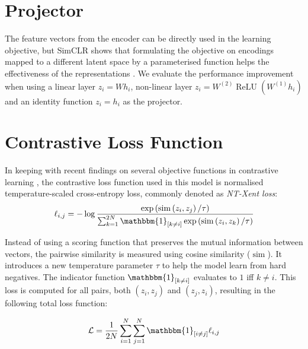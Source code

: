 \section{Projector}
The feature vectors from the encoder can be directly used in the learning objective, but SimCLR shows that formulating the objective on encodings mapped to a different latent space by a parameterised function helps the effectiveness of the representations \cite{chen_simple_2020}.
We evaluate the performance improvement when using a linear layer $z_i = Wh_i$, non-linear layer $z_i = W^{(2)}\operatorname{ReLU}(W^{(1)}h_i)$ and an identity function $z_i = h_i$ as the projector.


\section{Contrastive Loss Function}
In keeping with recent findings on several objective functions in contrastive learning \cite{chen_simple_2020}, the contrastive loss function used in this model is normalised temperature-scaled cross-entropy loss, commonly denoted as \emph{NT-Xent loss}:
\begin{equation}
    \label{ntxent_loss}
    \ell_{i, j}=-\log \frac{\exp \left(\operatorname{sim}\left(z_{i}, z_{j}\right) / \tau\right)}{\sum_{k=1}^{2 N} \mathbbm{1}_{[k \neq i]} \exp \left(\operatorname{sim}\left(z_{i}, z_{k}\right) / \tau\right)}
\end{equation}

Instead of using a scoring function that preserves the mutual information between vectors, the pairwise similarity is measured using cosine similarity ($\operatorname{sim}$).
It introduces a new temperature parameter $\tau$ to help the model learn from hard negatives.
The indicator function $\mathbbm{1}_{[k \neq i]}$ evaluates to $1$ iff $k\neq i$.
This loss is computed for all pairs, both $(z_i, z_j)$ and $(z_j, z_i)$, resulting in the following total loss function:

\begin{equation}
    \label{total_xent_loss}
    \mathcal{L} = \frac{1}{2N}\sum_{i=1}^{N}\sum_{j=1}^{N} \mathbbm{1}_{[i\neq j]}\ell_{i, j}
\end{equation}


